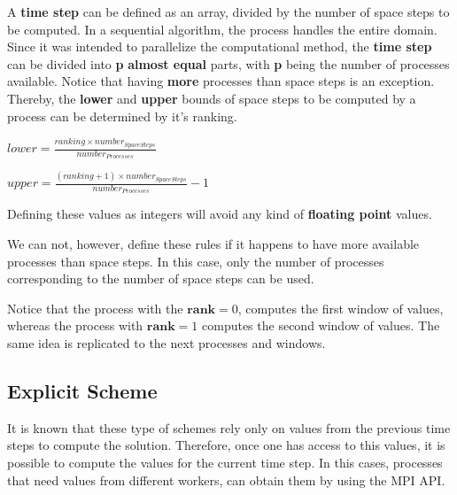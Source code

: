 \documentclass[12pt]{article}
\begin{document}
\par A \textbf{time step} can be defined as an array, divided by the number of space steps to be computed. In a sequential algorithm, the process handles the entire domain. Since it was intended to parallelize the computational method, the \textbf{time step} can be divided into \textbf{p} \textbf{almost equal} parts, with \textbf{p} being the number of processes available. Notice that having \textbf{more} processes than space steps is an exception. Thereby, the \textbf{lower} and \textbf{upper} bounds of space steps to be computed by a process can be determined by it's ranking.
\newline
\begin{center}
\large
\begin{minipage}{.5\textwidth}
  \centering
  $
  	lower = \frac{ranking \times number_{Space Steps} }{number_{Processes}}
  $
\end{minipage}%
\begin{minipage}{.5\textwidth}
  \centering
  $
  	upper = \frac{ (ranking + 1) \times number_{Space Steps} }{number_{Processes}} - 1
  $
\end{minipage}
\end{center}
\hfill
\par Defining these values as integers will avoid any kind of \textbf{floating point} values.
\par We can not, however, define these rules if it happens to have more available processes than space steps. In this case, only the number of processes corresponding to the number of space steps can be used.
\par Notice that the process with the $\textbf{rank} = 0$, computes the first window of values, whereas the process with $\textbf{rank} = 1$ computes the second window of values. The same idea is replicated to the next processes and windows.

\subsection*{Explicit Scheme}

\par It is known that these type of schemes rely only on values from the previous time steps to compute the solution\cite{fraga}. Therefore, once one has access to this values, it is possible to compute the values for the current time step. In this cases, processes that need values from different workers, can obtain them by using the MPI API.
\end{document}
